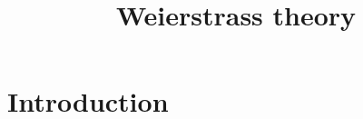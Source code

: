 






\title{Weierstrass theory}







\maketitle


\tableofcontents



\section{Introduction}\label{sec-introduction}

\cite{stacks-project}

\printbibliography
